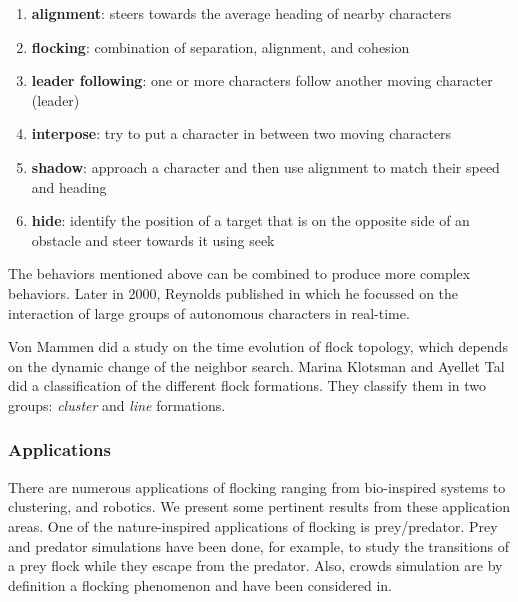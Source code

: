 \begin{enumerate}
\item \textbf{alignment}: steers towards the average heading of nearby characters
\item \textbf{flocking}: combination of separation, alignment, and cohesion
\item \textbf{leader following}: one or more characters follow another moving character (leader)
\item \textbf{interpose}: try to put a character in between two moving characters
\item \textbf{shadow}: approach a character and then use alignment to match their speed and heading
\item \textbf{hide}: identify the position of a target that is on the opposite side of an obstacle and  steer towards it using seek
\end{enumerate} 
 
The behaviors mentioned above can be combined to produce more complex behaviors. Later in 2000, Reynolds published \cite{craigInteractionGroups} in which he focussed on the interaction of large groups of autonomous characters in real-time. 

Von Mammen did a study on the time evolution of flock topology, which depends on the dynamic change of the neighbor search\cite{spatialSwarms}. Marina Klotsman and Ayellet Tal  did a classification of the different flock formations\cite{lineFormations}. They classify them in two groups: \textit{cluster} and \textit{line} formations.


\subsubsection{Applications}
There are numerous applications of flocking ranging from bio-inspired systems to clustering, and robotics. We present some pertinent results from these application areas. One of the nature-inspired applications of flocking is prey/predator\cite{gems2}. Prey and predator simulations have been done, for example, to study the transitions of a prey flock while they escape from the predator\cite{preyFlock}. Also, crowds simulation are by definition a flocking phenomenon and have been considered in\cite{crowdsPS3}. 

